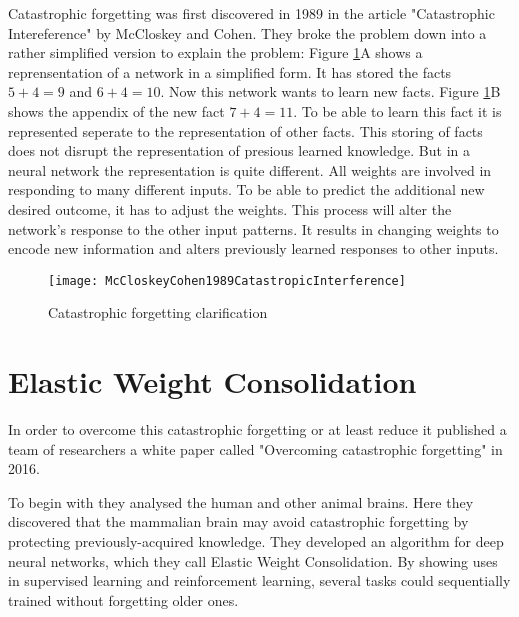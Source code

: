 Catastrophic forgetting was first discovered in 1989 in the article "Catastrophic Intereference" by McCloskey and Cohen.
They broke the problem down into a rather simplified version to explain the problem:
Figure \ref{fig:catastrophic_forgetting_clarification}A shows a reprensentation of a network in a simplified form.
It has stored the facts $5 + 4 = 9$ and $6 + 4 = 10$.
\hfill \break
Now this network wants to learn new facts.
Figure \ref{fig:catastrophic_forgetting_clarification}B shows the appendix of the new fact $7 + 4 = 11$.
To be able to learn this fact it is represented seperate to the representation of other facts.
This storing of facts does not disrupt the representation of presious learned knowledge.
\hfill \break
But in a neural network the representation is quite different.
All weights are involved in responding to many different inputs.
To be able to predict the additional new desired outcome, it has to adjust the weights.
This process will alter the network's response to the other input patterns.
It results in changing weights to encode new information and alters previously learned responses to other inputs.
\cite{psychology_learning_mccloskey_cohen}

\begin{figure}[H]
    \centering
    \texttt{[image: McCloskeyCohen1989CatastropicInterference]}
    \caption{\cite[page 148]{psychology_learning_mccloskey_cohen} Catastrophic forgetting clarification}
    \label{fig:catastrophic_forgetting_clarification}
\end{figure}

\section{Elastic Weight Consolidation}
\label{foundation_ewc}

In order to overcome this catastrophic forgetting or at least reduce it published a team of researchers a white paper called "Overcoming catastrophic forgetting" in 2016.
\cite{elastic-weight-consolidation}

To begin with they analysed the human and other animal brains.
Here they discovered that the mammalian brain may avoid catastrophic forgetting by protecting previously-acquired knowledge.
They developed an algorithm for deep neural networks, which they call Elastic Weight Consolidation.
By showing uses in supervised learning and reinforcement learning, several tasks could sequentially trained without forgetting older ones.
\cite{elastic-weight-consolidation}

